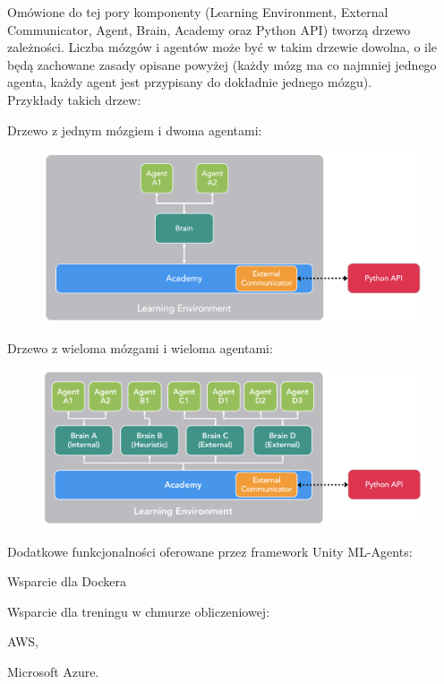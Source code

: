 Omówione do tej pory komponenty (Learning Environment, External Communicator, Agent, Brain, Academy oraz Python API) tworzą drzewo zależności. Liczba mózgów i agentów może być w takim drzewie dowolna, o ile będą zachowane zasady opisane powyżej (każdy mózg ma co najmniej jednego agenta, każdy agent jest przypisany do dokładnie jednego mózgu). \\ Przykłady takich drzew:
\begin{itemize*}
\item Drzewo z jednym mózgiem i dwoma agentami:
\begin{figure}[h]
\begin{center}
\includegraphics[width=15cm]{resources/figures/unitymla_learning_env_example.png}
\label{UnityMlaSimpleModel}
\end{center}
\end{figure}

\item Drzewo z wieloma mózgami i wieloma agentami:
\begin{figure}[h]
\begin{center}
\includegraphics[width=15cm]{resources/figures/unitymla_learning_env_example_2.png}
\label{UnityMlaComplexModel}
\end{center}
\end{figure}

\end{itemize*}
\newpage
Dodatkowe funkcjonalności oferowane przez framework Unity ML-Agents:
\begin{enumerate*}
\item Wsparcie dla Dockera \cite{unitymla:docker}
\item Wsparcie dla treningu w chmurze obliczeniowej:
\begin{itemize*}
\item AWS,
\item Microsoft Azure.
\end{itemize*}
\end{enumerate*}

